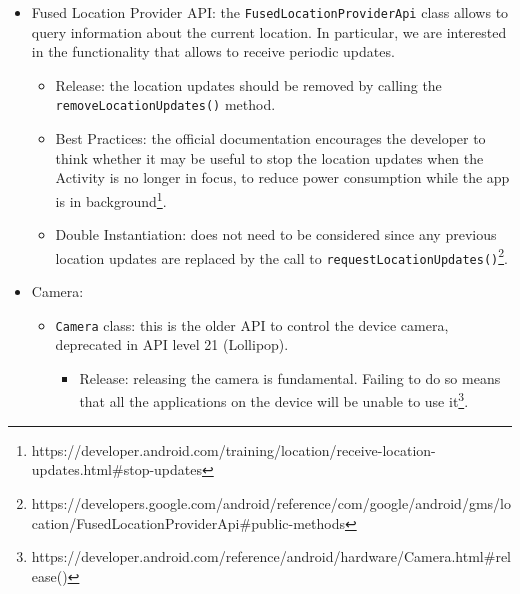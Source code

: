 \documentclass[11pt,a4paper,notitlepage]{article}
\begin{document}
\begin{itemize}
	\begin{itemize}
		\item Release: the API Client should always be disconnected when the application is done using it.
		\item Best Practices: the official recommendation is to connect during \texttt{onStart()} and to disconnect during \texttt{onStop()}\footnote{https://developers.google.com/android/guides/api-client\#start\_a\_manually\_managed\_connection}.
		\item Double Instantiation: it is not a problem since the call to \texttt{connect()} returns immediately if the client is already connected or connecting\footnote{https://developers.google.com/android/reference/com/google/android/gms/common/api/GoogleApiClient\#public-methods}.
	\end{itemize}
	\item Fused Location Provider API: the \texttt{FusedLocationProviderApi} class allows to query information about the current location. In particular, we are interested in the functionality that allows to receive periodic updates.
	\begin{itemize}
		\item Release: the location updates should be removed by calling the \texttt{removeLocationUpdates()} method.
		\item Best Practices: the official documentation encourages the developer to think whether it may be useful to stop the location updates when the Activity is no longer in focus, to reduce power consumption while the app is in background\footnote{https://developer.android.com/training/location/receive-location-updates.html\#stop-updates}.
		\item Double Instantiation: does not need to be considered since any previous location updates are replaced by the call to \texttt{requestLocationUpdates()}\footnote{https://developers.google.com/android/reference/com/google/android/gms/location/FusedLocationProviderApi\#public-methods}.
	\end{itemize}
	\item Camera:
		\begin{itemize}
			\item \texttt{Camera} class: this is the older API to control the device camera, deprecated in API level 21 (Lollipop).
			\begin{itemize}
				\item Release: releasing the camera is fundamental. Failing to do so means that all the applications on the device will be unable to use it\footnote{https://developer.android.com/reference/android/hardware/Camera.html\#release()}.

\end{itemize}
\end{itemize}
\end{itemize}
\end{document}
